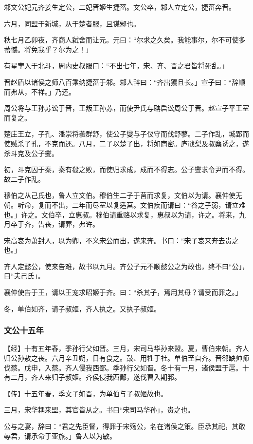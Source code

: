 \documentclass[]{article}
\begin{document}
邾文公妃元齐姜生定公，二妃晋姬生捷菑。文公卒，邾人立定公，捷菑奔晋。

六月，同盟于新城，从于楚者服，且谋邾也。

秋七月乙卯夜，齐商人弑舍而让元。元曰：``尔求之久矣。我能事尔，尔不可使多蓄憾。将免我乎？尔为之！」

有星孛入于北斗，周内史叔服曰：``不出七年，宋、齐、晋之君皆将死乱。」

晋赵盾以诸侯之师八百乘纳捷菑于邾。邾人辞曰：``齐出玃且长。」宣子曰：``辞顺而弗从，不祥。」乃还。

周公将与王孙苏讼于晋，王叛王孙苏，而使尹氏与聃启讼周公于晋。赵宣子平王室而复之。

楚庄王立，子孔、潘崇将袭群舒，使公子燮与子仪守而伐舒蓼。二子作乱，城郢而使贼杀子孔，不克而还。八月，二子以楚子出，将如商密。庐戢梨及叔麋诱之，遂杀斗克及公子燮。

初，斗克囚于秦，秦有殽之败，而使归求成，成而不得志。公子燮求令尹而不得。故二子作乱。

穆伯之从己氏也，鲁人立文伯。穆伯生二子于莒而求复，文伯以为请。襄仲使无朝。听命，复而不出，二年而尽室以复适莒。文伯疾而请曰：``谷之子弱，请立难也。」许之。文伯卒，立惠叔。穆伯请重赂以求复，惠叔以为请，许之。将来，九月卒于齐，告丧，请葬，弗许。

宋高哀为萧封人，以为卿，不义宋公而出，遂来奔。书曰：``宋子哀来奔去贵之也。」

齐人定懿公，使来告难，故书以九月。齐公子元不顺懿公之为政也，终不曰``公」，曰``夫己氏」。

襄仲使告于王，请以王宠求昭姬于齐。曰：``杀其子，焉用其母？请受而罪之。」

冬，单伯如齐，请子叔姬，齐人执之。又执子叔姬。

\hypertarget{header-n1229}{%
\subsubsection{文公十五年}\label{header-n1229}}

【经】十有五年春，季孙行父如晋。三月，宋司马华孙来盟。夏，曹伯来朝。齐人归公孙敖之丧。六月辛丑朔，日有食之。鼓、用牲于社。单伯至自齐。晋郤缺帅师伐蔡。戊申，入蔡。齐人侵我西鄙。季孙行父如晋。冬十有一月，诸侯盟于扈。十有二月，齐人来归子叔姬。齐侯侵我西鄙，遂伐曹入期郛。

【传】十五年春，季文子如晋，为单伯与子叔姬故也。

三月，宋华耦来盟，其官皆从之。书曰``宋司马华孙」，贵之也。

公与之宴，辞曰：``君之先臣督，得罪于宋殇公，名在诸侯之策。臣承其祀，其敢辱君，请承命于亚旅。」鲁人以为敏。
\end{document}
